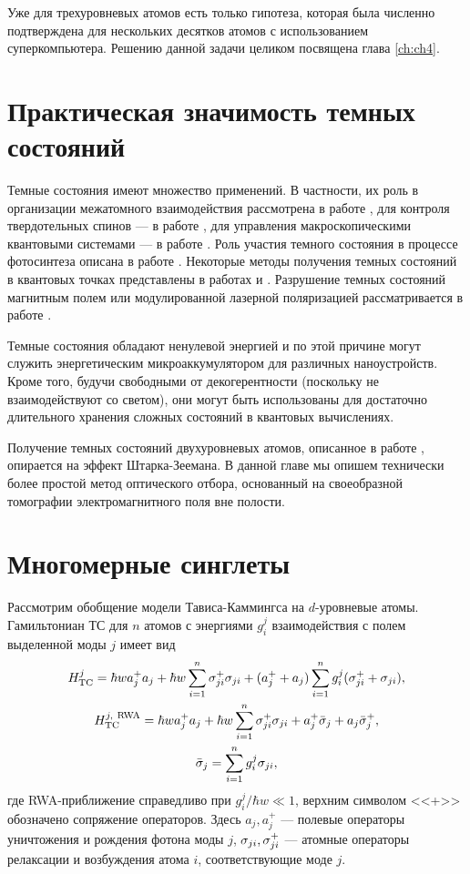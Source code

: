 Уже для трехуровневых атомов есть только гипотеза, которая была численно подтверждена для нескольких десятков атомов с использованием суперкомпьютера. Решению данной задачи целиком посвящена глава \ref{ch:ch4}.

\section{Практическая значимость темных состояний}\label{subsec:ch3/sect2}
Темные состояния имеют множество применений. В частности, их роль в организации межатомного взаимодействия рассмотрена в работе \cite{dark_states_properties_andre}, для контроля твердотельных спинов --- в работе \cite{dark_states_properties_hansom}, для управления макроскопическими квантовыми системами --- в работе \cite{dark_states_properties_bose_einstein}. Роль участия темного состояния в процессе фотосинтеза описана в работе \cite{dark_states_properties_photosynthesis}. Некоторые методы получения темных состояний в квантовых точках представлены в работах \cite{dark_states_properties_poltl} и \cite{dark_states_properties_tanamoto}. Разрушение темных состояний магнитным полем или модулированной лазерной поляризацией рассматривается в работе \cite{dark_states_properties_destabilization}.

Темные состояния обладают ненулевой энергией и по этой причине могут служить энергетическим микроаккумулятором для различных
наноустройств. Кроме того, будучи свободными от декогерентности (поскольку не взаимодействуют со светом), они могут быть использованы для достаточно длительного хранения сложных состояний в квантовых вычислениях.

Получение темных состояний двухуровневых атомов, описанное в работе \cite{dark_states_properties_tanamoto}, опирается на эффект Штарка-Зеемана. В данной главе мы опишем технически более простой метод оптического отбора, основанный на своеобразной томографии электромагнитного поля вне полости.

\section{Многомерные синглеты}\label{sec:ch3/sect2}
Рассмотрим обобщение модели Тависа-Каммингса на $d$-уровневые атомы. Гамильтониан ТС для $n$ атомов с энергиями $g^{j}_{i}$ взаимодействия с полем выделенной моды $j$ имеет вид
\begin{gather}
	H^j_{\text{TC}} = \hbar w a_{j}^{+}a_j + \hbar w \sum\limits_{i=1}^{n}\sigma_{ji}^{+}\sigma_{ji} + (a_{j}^{+} + a_{j})\sum\limits_{i=1}^{n}g^{j}_{i}(\sigma_{ji}^{+} + \sigma_{ji}),\notag\\
	H^{j,\ \text{RWA}}_{\text{TC}} = \hbar w a_{j}^{+}a_{j} + \hbar w \sum\limits_{i=1}^{n}\sigma_{ji}^{+}\sigma_{ji} + a_{j}^{+}\bar{\sigma}_{j} + a_{j}\bar{\sigma}_{j}^{+},\\
	\bar{\sigma}_{j} = \sum\limits_{i=1}^ng^{j}_{i}\sigma_{ji},\notag
\end{gather}
где RWA-приближение \cite{ozhigov_qq,rwa_rabi_1,rwa_rabi_2} справедливо при $g^{j}_{i}/\hbar w\ll 1$, верхним символом <<+>> обозначено сопряжение операторов. Здесь $a_{j},a_{j}^{+}$ --- полевые операторы уничтожения и рождения фотона моды $j$, $\sigma_{ji},\sigma_{ji}^{+}$ --- атомные операторы релаксации и возбуждения атома $i$, соответствующие моде $j$.

